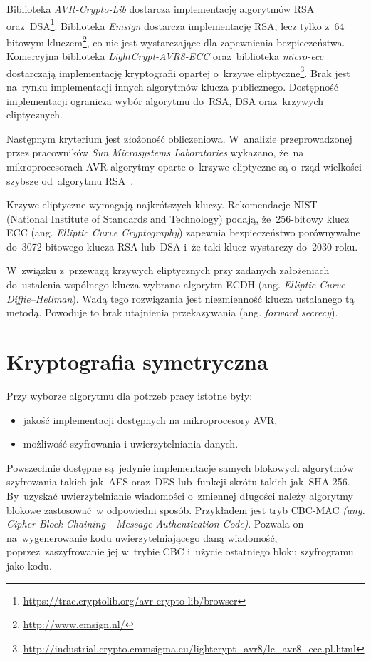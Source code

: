 Biblioteka \emph{AVR-Crypto-Lib} dostarcza implementację algorytmów RSA oraz~DSA\footnote{\url{https://trac.cryptolib.org/avr-crypto-lib/browser}}. Biblioteka \emph{Emsign} dostarcza implementację RSA, lecz tylko z~64 bitowym kluczem\footnote{\url{http://www.emsign.nl/}}, co nie jest wystarczające dla zapewnienia bezpieczeństwa. Komercyjna biblioteka \emph{LightCrypt-AVR8-ECC} oraz~biblioteka \emph{micro-ecc} dostarczają implementację kryptografii opartej o~krzywe eliptyczne\footnote{\url{http://industrial.crypto.cmmsigma.eu/lightcrypt_avr8/lc_avr8_ecc.pl.html}}. Brak jest na~rynku implementacji innych algorytmów klucza publicznego. Dostępność implementacji ogranicza wybór algorytmu do~RSA, DSA oraz~krzywych eliptycznych.

Następnym kryterium jest złożoność obliczeniowa. W~analizie przeprowadzonej przez pracowników \emph{Sun Microsystems Laboratories} wykazano, że~na mikroprocesorach AVR algorytmy oparte o~krzywe eliptyczne są o~rząd wielkości szybsze od~algorytmu RSA~\cite{Gura2004}.

Krzywe eliptyczne wymagają najkrótszych kluczy. Rekomendacje NIST~\cite{Nist} (National Institute of Standards and Technology) podają, że~256-bitowy klucz ECC (ang. \emph{Elliptic Curve Cryptography}) zapewnia bezpieczeństwo porównywalne do~3072-bitowego klucza RSA lub~DSA i~że taki klucz wystarczy do~2030 roku.

W~związku z~przewagą krzywych eliptycznych przy zadanych założeniach do~ustalenia wspólnego klucza wybrano algorytm ECDH (ang. \emph{Elliptic Curve Diffie--Hellman}). Wadą tego rozwiązania jest niezmienność klucza ustalanego tą metodą. Powoduje to brak utajnienia przekazywania (ang. \emph{forward secrecy}).

\section{Kryptografia symetryczna}
\label{sec:kryptoSym}

Przy wyborze algorytmu dla potrzeb pracy istotne były:

\begin{itemize}
\item jakość implementacji dostępnych na mikroprocesory AVR,
\item możliwość szyfrowania i uwierzytelniania danych.
\end{itemize}

Powszechnie dostępne są jedynie implementacje samych blokowych algorytmów szyfrowania takich jak~AES oraz~DES lub~funkcji skrótu takich jak~SHA-256. By~uzyskać uwierzytelnianie wiadomości o~zmiennej długości należy algorytmy blokowe zastosować w odpowiedni sposób. Przykładem jest tryb CBC-MAC {\itshape (ang. Cipher Block Chaining - Message Authentication Code)}. Pozwala on na~wygenerowanie kodu uwierzytelniającego daną wiadomość, poprzez~zaszyfrowanie jej w~trybie CBC i~użycie ostatniego bloku szyfrogramu jako kodu.

